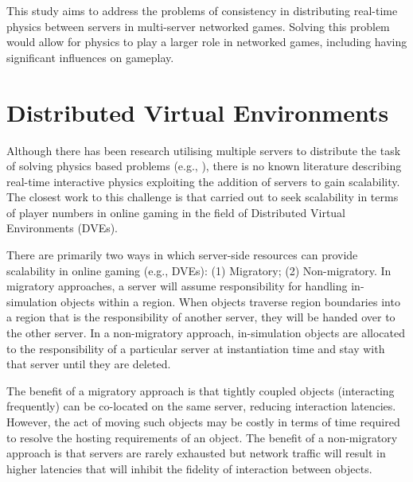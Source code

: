 This study aims to address the problems of consistency in distributing real-time physics between servers in multi-server networked games. Solving this problem would allow for physics to play a larger role in networked games, including having significant influences on gameplay.

\section{Distributed Virtual Environments} \label{distrubted_virtual_env}

Although there has been research utilising multiple servers to distribute the task of solving physics based problems (e.g., \cite{mashayekhi2018automatically}), there is no known literature describing real-time interactive physics exploiting the addition of servers to gain scalability. The closest work to this challenge is that carried out to seek scalability in terms of player numbers in online gaming in the field of Distributed Virtual Environments (DVEs). 

There are primarily two ways in which server-side resources can provide scalability in online gaming (e.g., DVEs): (1) Migratory; (2) Non-migratory. In migratory approaches, a server will assume responsibility for handling in-simulation objects within a region. When objects traverse region boundaries into a region that is the responsibility of another server, they will be handed over to the other server. In a non-migratory approach, in-simulation objects are allocated to the responsibility of a particular server at instantiation time and stay with that server until they are deleted.

The benefit of a migratory approach is that tightly coupled objects (interacting frequently) can be co-located on the same server, reducing interaction latencies. However, the act of moving such objects may be costly in terms of time required to resolve the hosting requirements of an object. The benefit of a non-migratory approach is that servers are rarely exhausted but network traffic will result in higher latencies that will inhibit the fidelity of interaction between objects.

